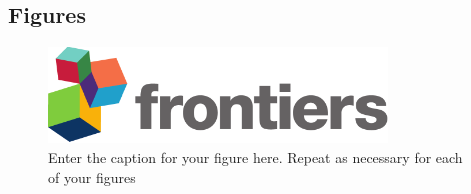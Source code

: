 \documentclass[utf8]{frontiers_suppmat} %
\begin{document}
    \subsection{Figures}


    \begin{figure}[htbp]
        \begin{center}
            \includegraphics[width=9cm]{logo1}%
        \end{center}
        \caption{ Enter the caption for your figure here. Repeat as necessary for each of your figures}\label{fig:1}
    \end{figure}
\end{document}
